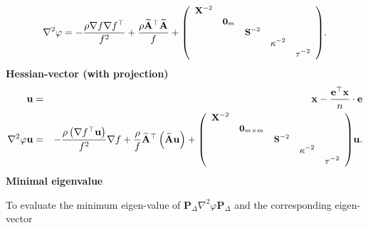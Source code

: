 \documentclass{article}
\newcommand{\cdummy}{\cdot}
\newcommand{\tmstrong}[1]{\textbf{#1}}
\newcommand{\x}{\mathbf{x}}
\newcommand{\A}{\mathbf{A}}
\newcommand{\0}{\textbf{0}}
\newcommand{\e}{\mathbf{e}}
\newcommand{\n}{\nabla}
\newcommand{\X}{\mathbf{X}}
\newcommand{\tmP}{\mathbf{P}}
\newcommand{\tmu}{\mathbf{u}}
\newcommand{\bs}{\mathbf{S}}
\begin{document}
\[ \n^2 \varphi = - \frac{\rho \n f \n f^{\top}}{f^2} + \frac{\rho
   \widetilde{\A}^{\top} \widetilde{\A}}{f} +
   \small{\left(\begin{array}{ccccc}
     \X^{- 2} &  &  &  & \\
     & \0_m &  &  & \\
     &  & \bs^{- 2} &  & \\
     &  &  & \kappa^{- 2} & \\
     &  &  &  & \tau^{- 2}
   \end{array}\right)} . \]
{\tmstrong{Hessian-vector (with projection)}}
\begin{eqnarray*}
  \tmu & = & \x - \frac{\e^{\top} \x}{n} \cdummy \e\\
  \n^2 \varphi \tmu & = & - \frac{\rho \left( \n f^{\top} \tmu \right)}{f^2}
  \n f + \frac{\rho}{f} \widetilde{\A}^{\top} \left( \widetilde{\A} \tmu
  \right) + \small{\left(\begin{array}{ccccc}
    \X^{- 2} &  &  &  & \\
    & \0_{m \times m} &  &  & \\
    &  & \bs^{- 2} &  & \\
    &  &  & \kappa^{- 2} & \\
    &  &  &  & \tau^{- 2}
  \end{array}\right)} \tmu .
\end{eqnarray*}
{\tmstrong{Minimal eigenvalue}}

To evaluate the minimum eigen-value of $\tmP_{\Delta} \n^2 \varphi
\tmP_{\Delta}$ and the corresponding eigen-vector
\end{document}
